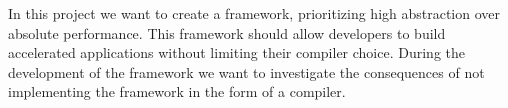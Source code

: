In this project we want to create a framework, prioritizing high abstraction over absolute performance. This framework should allow developers to build accelerated applications without limiting their compiler choice. During the development of the framework we want to investigate the consequences of not implementing the framework in the form of a compiler.


